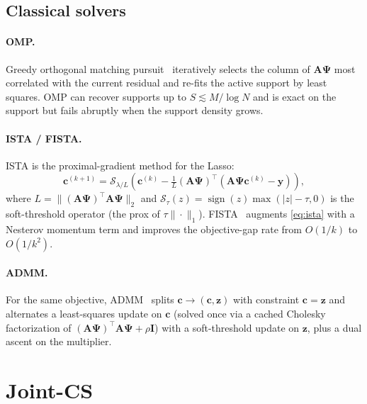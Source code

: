 \documentclass{article}
\begin{document}
\subsection{Classical solvers}

\paragraph{OMP.} Greedy orthogonal matching pursuit~\citep{tropp2007signal} iteratively selects the column of $\boldsymbol{A}\boldsymbol{\Psi}$ most correlated with the current residual and re-fits the active support by least squares. OMP can recover supports up to $S \lesssim M / \log N$ and is exact on the support but fails abruptly when the support density grows.

\paragraph{ISTA / FISTA.} ISTA is the proximal-gradient method for the Lasso:
\begin{equation}
  \boldsymbol{c}^{(k+1)} =
  \mathcal{S}_{\lambda/L}\!\left(
    \boldsymbol{c}^{(k)} - \tfrac{1}{L} (\boldsymbol{A}\boldsymbol{\Psi})^\top
    \!\left( \boldsymbol{A}\boldsymbol{\Psi}\boldsymbol{c}^{(k)} - \boldsymbol{y} \right)
  \right),
  \label{eq:ista}
\end{equation}
where $L = \|(\boldsymbol{A}\boldsymbol{\Psi})^\top \boldsymbol{A}\boldsymbol{\Psi}\|_2$ and $\mathcal{S}_\tau(z) = \operatorname{sign}(z)\max(|z|-\tau, 0)$ is the soft-threshold operator (the prox of $\tau\|\cdot\|_1$). FISTA~\citep{beck2009fast} augments \eqref{eq:ista} with a Nesterov momentum term and improves the objective-gap rate from $O(1/k)$ to $O(1/k^2)$.

\paragraph{ADMM.} For the same objective, ADMM~\citep{boyd2011distributed} splits $\boldsymbol{c} \to (\boldsymbol{c}, \boldsymbol{z})$ with constraint $\boldsymbol{c} = \boldsymbol{z}$ and alternates a least-squares update on $\boldsymbol{c}$ (solved once via a cached Cholesky factorization of $(\boldsymbol{A}\boldsymbol{\Psi})^\top \boldsymbol{A}\boldsymbol{\Psi} + \rho \boldsymbol{I}$) with a soft-threshold update on $\boldsymbol{z}$, plus a dual ascent on the multiplier.


\section{Joint-CS}
\label{sec:method}
\end{document}

